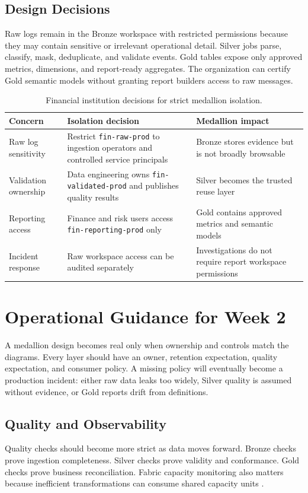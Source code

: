\subsection{Design Decisions}
Raw logs remain in the Bronze workspace with restricted permissions because they may contain sensitive or irrelevant operational detail. Silver jobs parse, classify, mask, deduplicate, and validate events. Gold tables expose only approved metrics, dimensions, and report-ready aggregates. The organization can certify Gold semantic models without granting report builders access to raw messages.

\begin{table}[H]
\centering
\small
\begin{tabular}{@{}p{3.3cm}p{5.0cm}p{5.0cm}@{}}
\toprule
\textbf{Concern} & \textbf{Isolation decision} & \textbf{Medallion impact} \\
\midrule
Raw log sensitivity & Restrict \texttt{fin-raw-prod} to ingestion operators and controlled service principals & Bronze stores evidence but is not broadly browsable \\
Validation ownership & Data engineering owns \texttt{fin-validated-prod} and publishes quality results & Silver becomes the trusted reuse layer \\
Reporting access & Finance and risk users access \texttt{fin-reporting-prod} only & Gold contains approved metrics and semantic models \\
Incident response & Raw workspace access can be audited separately & Investigations do not require report workspace permissions \\
\bottomrule
\end{tabular}
\caption{Financial institution decisions for strict medallion isolation.}
\label{tab:chapter2-financial-decisions}
\end{table}

\section{Operational Guidance for Week 2}
A medallion design becomes real only when ownership and controls match the diagrams. Every layer should have an owner, retention expectation, quality expectation, and consumer policy. A missing policy will eventually become a production incident: either raw data leaks too widely, Silver quality is assumed without evidence, or Gold reports drift from definitions.

\subsection{Quality and Observability}
Quality checks should become more strict as data moves forward. Bronze checks prove ingestion completeness. Silver checks prove validity and conformance. Gold checks prove business reconciliation. Fabric capacity monitoring also matters because inefficient transformations can consume shared capacity units \cite{microsoftFabricMetricsApp}.

